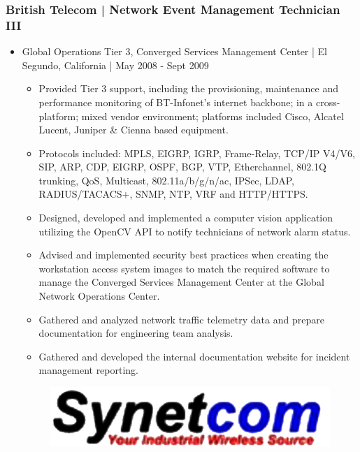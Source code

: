 \documentclass[letter,10pt]{article}
\begin{document}
\subsubsection*{British Telecom | Network Event Management Technician III}
\label{sec:org154d503}
\begin{itemize}
\item Global Operations Tier 3, Converged Services Management Center | El Segundo, California | May 2008 - Sept 2009
\label{sec:org6b74ff4}
\begin{itemize}
\item Provided Tier 3 support, including the provisioning, maintenance and performance monitoring of BT-Infonet’s internet backbone; in a cross-platform; mixed vendor environment; platforms included Cisco, Alcatel Lucent, Juniper \& Cienna based equipment.
\item Protocols included: MPLS, EIGRP, IGRP, Frame-Relay, TCP/IP V4/V6, SIP, ARP, CDP, EIGRP, OSPF, BGP, VTP, Etherchannel, 802.1Q trunking, QoS, Multicast, 802.11a/b/g/n/ac, IPSec, LDAP, RADIUS/TACACS+, SNMP, NTP, VRF and HTTP/HTTPS.
\item Designed, developed and implemented a computer vision application utilizing the OpenCV API to notify technicians of network alarm status.
\item Advised and implemented security best practices when creating the workstation access system images to match the required software to manage the Converged Services Management Center at the Global Network Operations Center.
\item Gathered and analyzed network traffic telemetry data and prepare documentation for engineering team analysis.
\item Gathered and developed the internal documentation website for incident management reporting.
\end{itemize}



\begin{figure}
\includegraphics[width=0.8\linewidth]{./img/50p_cr_synetcom.jpg}
\end{figure}
\end{itemize}
\end{document}
